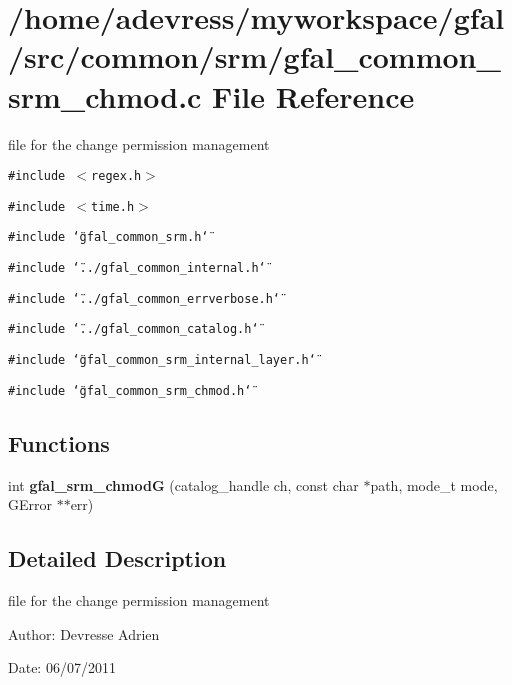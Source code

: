 \section{/home/adevress/myworkspace/gfal/src/common/srm/gfal\_\-common\_\-srm\_\-chmod.c File Reference}
\label{gfal__common__srm__chmod_8c}
file for the change permission management 

{\tt \#include $<$regex.h$>$}\par
{\tt \#include $<$time.h$>$}\par
{\tt \#include \char`\"{}gfal\_\-common\_\-srm.h\char`\"{}}\par
{\tt \#include \char`\"{}../gfal\_\-common\_\-internal.h\char`\"{}}\par
{\tt \#include \char`\"{}../gfal\_\-common\_\-errverbose.h\char`\"{}}\par
{\tt \#include \char`\"{}../gfal\_\-common\_\-catalog.h\char`\"{}}\par
{\tt \#include \char`\"{}gfal\_\-common\_\-srm\_\-internal\_\-layer.h\char`\"{}}\par
{\tt \#include \char`\"{}gfal\_\-common\_\-srm\_\-chmod.h\char`\"{}}\par
\subsection*{Functions}
\begin{CompactItemize}
\item 
int \textbf{gfal\_\-srm\_\-chmod\-G} (catalog\_\-handle ch, const char $\ast$path, mode\_\-t mode, GError $\ast$$\ast$err)\label{gfal__common__srm__chmod_8c_fd872388d22b732b6e1c9bcee8e3aa18}

\end{CompactItemize}


\subsection{Detailed Description}
file for the change permission management 

\begin{Desc}
\item[Author:]Devresse Adrien \end{Desc}
\begin{Desc}
\item[Date:]06/07/2011 \end{Desc}
